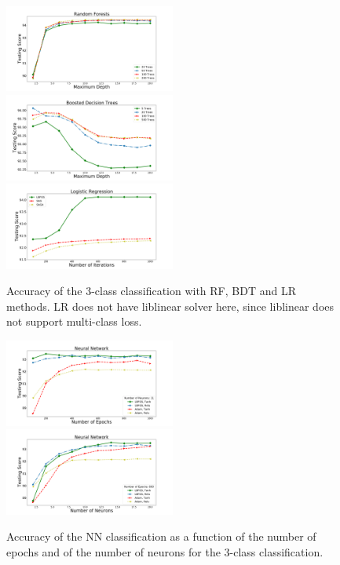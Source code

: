 \documentclass{aa}
\begin{document}
\begin{figure}[h]
\centering
\includegraphics[width=0.5\textwidth]{plots/rf_train_multi.pdf}\\
\includegraphics[width=0.5\textwidth]{plots/bdt_train_multi.pdf}
\includegraphics[width=0.5\textwidth]{plots/lr_train_multi.pdf}
\caption{Accuracy of the 3-class classification with RF, BDT and LR  methods. LR does not have liblinear solver here, since liblinear 
does not support multi-class loss.
}
\label{fig:tree_multi}
\end{figure}

\begin{figure}[h]
\centering
\includegraphics[width=0.5\textwidth]{plots/nn_epoch_train_multi.pdf}\\
\includegraphics[width=0.5\textwidth]{plots/nn_neuron_train_multi.pdf}
\caption{Accuracy of the NN classification as a function of the number of epochs and of the number of neurons
 for the 3-class classification. 
 }
\label{fig:nets_multi}
\end{figure}
\end{document}
